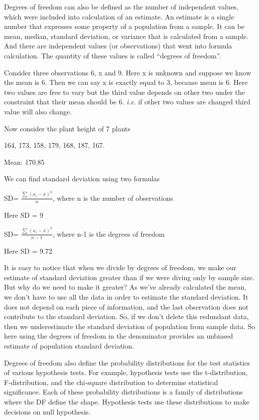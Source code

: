 \documentclass[
]{book}
\begin{document}
Degrees of freedom can also be defined as the number of independent
values, which were included into calculation of an estimate. An estimate
is a single number that expresses some property of a population from a
sample. It can be mean, median, standard deviation, or variance that is
calculated from a sample. And there are independent values (or
observations) that went into formula calculation. The quantity of these
values is called ``degrees of freedom''.

Consider three observations 6, x and 9. Here x is unknown and suppose we
know the mean is 6. Then we can say x is exactly equal to 3, because
mean is 6. Here two values are free to vary but the third value depends
on other two under the constraint that their mean should be 6. \emph{i}.\emph{e}.
if other two values are changed third value will also change.

Now consider the plant height of 7 plants

164, 173, 158, 179, 168, 187, 167.

Mean: 170.85

We can find standard deviation using two formulas

SD= \(\frac{\sum_{}^{}\left( x_{i} - \overline{x} \right)^{2}}{n}\), where
n is the number of observations

Here SD = 9

SD= \(\frac{\sum_{}^{}\left( x_{i} - \overline{x} \right)^{2}}{n - 1}\),
where n-1 is the degrees of freedom

Here SD = 9.72

It is easy to notice that when we divide by degrees of freedom, we make
our estimate of standard deviation greater than if we were diving only
by sample size. But why do we need to make it greater? As we've already
calculated the mean, we don't have to use all the data in order to
estimate the standard deviation. It does not depend on each piece of
information, and the last observation does not contribute to the
standard deviation. So, if we don't delete this redundant data, then we
underestimate the standard deviation of population from sample data. So here using the degrees of freedom in the denominator provides an unbiased estimate of population standard deviation.

Degrees of freedom also define the probability distributions for the
test statistics of various hypothesis tests. For example, hypothesis
tests use the t-distribution, F-distribution, and the chi-square
distribution to determine statistical significance. Each of these
probability distributions is a family of distributions where the DF
define the shape. Hypothesis tests use these distributions to make
decisions on null hypothesis.
\end{document}
